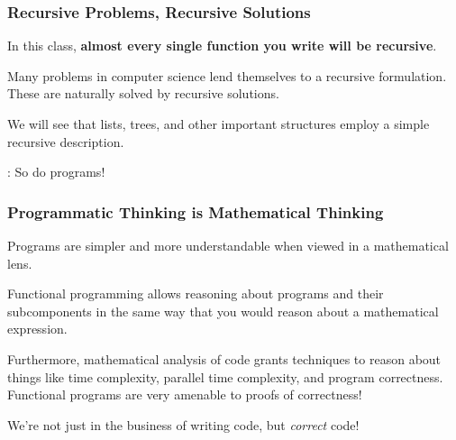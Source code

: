 \documentclass[aspectratio=169]{beamer}
\begin{document}
\begin{frame}[fragile]
  \frametitle{Recursive Problems, Recursive Solutions}

  In this class, \textbf{almost every single function you write will be recursive}.

  \vspace{\fill}

  Many problems in computer science lend themselves to a recursive formulation. These
  are naturally solved by recursive solutions.

  \vspace{\fill}

  We will see that lists, trees, and other important structures employ a simple 
  recursive description.

  \vspace{\fill}

  : So do programs!
\end{frame}

\begin{frame}[fragile]
  \frametitle{Programmatic Thinking is Mathematical Thinking}

  Programs are simpler and more understandable when viewed in a mathematical lens.
  
  \vspace{\fill}

  Functional programming allows reasoning about programs and their subcomponents
  in the same way that you would reason about a mathematical expression. 

  \vspace{\fill}

  Furthermore, mathematical analysis of code grants techniques to reason about 
  things like time complexity, parallel time complexity, and program correctness.
  Functional programs are very amenable to proofs of correctness! 

  \vspace{\fill}

  We're not just in the business of writing code, but \textit{correct} code!

\end{frame}
\end{document}
